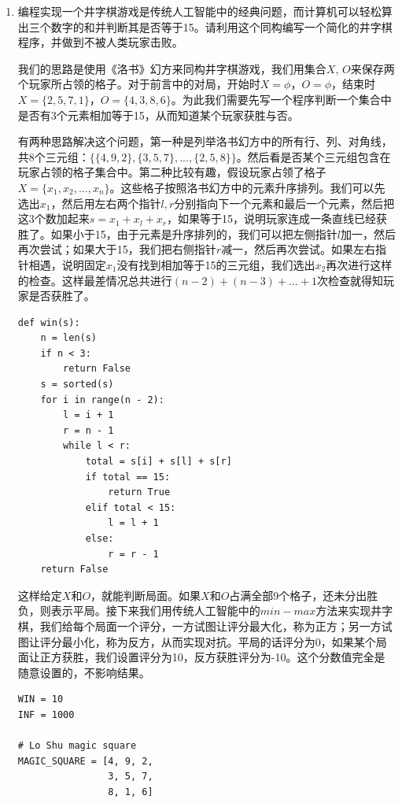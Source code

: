\documentclass[UTF8]{article}
\begin{document}
\begin{enumerate}
\item 编程实现一个井字棋游戏是传统人工智能中的经典问题，而计算机可以轻松算出三个数字的和并判断其是否等于15。请利用这个同构编写一个简化的井字棋程序，并做到不被人类玩家击败。

我们的思路是使用《洛书》幻方来同构井字棋游戏，我们用集合$X$, $O$来保存两个玩家所占领的格子。对于前言中的对局，开始时$X = \phi$，$O = \phi$，结束时$X = \{ 2, 5, 7, 1 \}$，$O = \{ 4, 3, 8, 6 \}$。为此我们需要先写一个程序判断一个集合中是否有3个元素相加等于15，从而知道某个玩家获胜与否。

有两种思路解决这个问题，第一种是列举洛书幻方中的所有行、列、对角线，共8个三元组：$\{ \{4, 9, 2\}, \{3, 5, 7\}, ..., \{2, 5, 8\} \}$。然后看是否某个三元组包含在玩家占领的格子集合中。第二种比较有趣，假设玩家占领了格子$ X = \{x_1, x_2, ..., x_n\}$。这些格子按照洛书幻方中的元素升序排列。我们可以先选出$x_1$，然后用左右两个指针$l, r$分别指向下一个元素和最后一个元素，然后把这3个数加起来$s = x_1 + x_l + x_r$，如果等于15，说明玩家连成一条直线已经获胜了。如果小于15，由于元素是升序排列的，我们可以把左侧指针$l$加一，然后再次尝试；如果大于15，我们把右侧指针$r$减一，然后再次尝试。如果左右指针相遇，说明固定$x_1$没有找到相加等于15的三元组，我们选出$x_2$再次进行这样的检查。这样最差情况总共进行$(n - 2)+ (n - 3) + ... + 1$次检查就得知玩家是否获胜了。

\lstset{language=Python
    , frame=single
}
\begin{lstlisting}
def win(s):
    n = len(s)
    if n < 3:
        return False
    s = sorted(s)
    for i in range(n - 2):
        l = i + 1
        r = n - 1
        while l < r:
            total = s[i] + s[l] + s[r]
            if total == 15:
                return True
            elif total < 15:
                l = l + 1
            else:
                r = r - 1
    return False
\end{lstlisting}

这样给定$X$和$O$，就能判断局面。如果$X$和$O$占满全部9个格子，还未分出胜负，则表示平局。接下来我们用传统人工智能中的$min-max$方法来实现井字棋，我们给每个局面一个评分，一方试图让评分最大化，称为正方；另一方试图让评分最小化，称为反方，从而实现对抗。平局的话评分为0，如果某个局面让正方获胜，我们设置评分为10，反方获胜评分为-10。这个分数值完全是随意设置的，不影响结果。

\begin{lstlisting}
WIN = 10
INF = 1000

# Lo Shu magic square
MAGIC_SQUARE = [4, 9, 2,
                3, 5, 7,
                8, 1, 6]


\end{lstlisting}
\end{enumerate}
\end{document}
